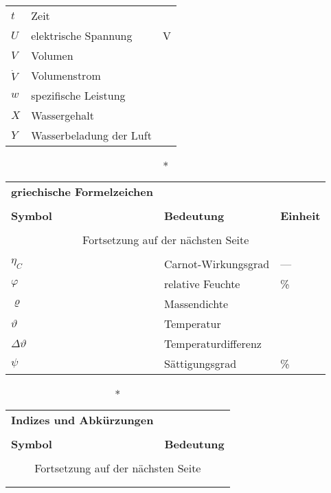 \begin{onehalfspacing}
\begin{longtable}[h]{p{} p{} p{}}
		$t$ & Zeit & \second\\
		$U$ & elektrische Spannung & V \\
		$V$ & Volumen & \cubic\meter\\
		$\dot{V}$&Volumenstrom&\cubic\meter\per\second\\
		$w$ & spezifische Leistung & \watt \per \kilogram\\
		$X$	& Wassergehalt & \kilogram \per \kilogram \\
		$Y$ & Wasserbeladung der Luft & \gram\per\kilogram\\
		
\end{longtable}

\begin{longtable}[h]{p{} p{} p{}}
		\caption*{\textbf{griechische Formelzeichen}} \\
		\\
		\textbf{Symbol} & \textbf{Bedeutung} & \textbf{Einheit} \\ %
		\endhead
		\\
		\multicolumn{3}{c}{Fortsetzung auf der nächsten Seite} \\
		\endfoot
		\multicolumn{3}{c}{ } \\
		\endlastfoot
		
		$\eta_{C}$ & Carnot-Wirkungsgrad & ---\\
		$\varphi$ & relative Feuchte & \% \\
		$\varrho$& Massendichte&\kilogrampercubicmetre\\
		$\vartheta $ & Temperatur  & \degreecelsius\\
		$\Delta\vartheta $ & Temperaturdifferenz  &\kelvin\\
		$\psi$ & Sättigungsgrad & \% \\
\end{longtable}

\begin{longtable}[h]{p{} p{}}
		\caption*{\textbf{Indizes und Abkürzungen}} \\
		\\
		\textbf{Symbol} & \textbf{Bedeutung} \\ %
		\endhead
		\\
		\multicolumn{2}{c}{Fortsetzung auf der nächsten Seite} \\
		\endfoot
		\multicolumn{2}{c}{ } \\
		\endlastfoot
		

\end{longtable}
\end{onehalfspacing}
